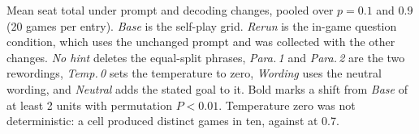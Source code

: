\begin{table}[t]
\caption{Mean seat total under prompt and decoding changes, pooled over $p=0.1$ and $0.9$
(20 games per entry). \emph{Base} is the self-play grid. \emph{Rerun} is the in-game
question condition, which uses the unchanged prompt and was collected with the other
changes. \emph{No hint} deletes the equal-split phrases, \emph{Para.\,1} and \emph{Para.\,2}
are the two rewordings, \emph{Temp.\,0} sets the temperature to zero, \emph{Wording} uses the
neutral wording, and \emph{Neutral} adds the stated goal to it. Bold marks a shift from
\emph{Base} of at least 2 units with permutation $P<0.01$. Temperature zero was not
deterministic: a cell produced \RobTempZeroDistinct{} distinct games in ten, against
\RobTempZeroBaseDistinct{} at 0.7.}
\label{tab:robust}

\end{table}
